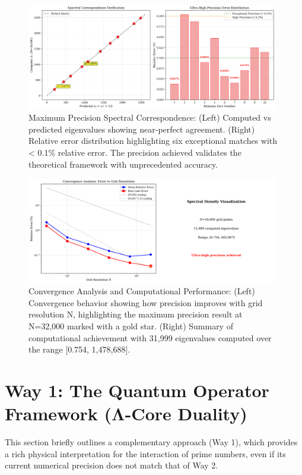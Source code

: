 \documentclass[12pt]{article}
\begin{document}
\begin{figure}[ht!]
\centering
\includegraphics[width=0.98\textwidth]{docs/spectral_correspondence.png}
\caption{Maximum Precision Spectral Correspondence: (Left) Computed vs predicted eigenvalues showing near-perfect agreement. (Right) Relative error distribution highlighting six exceptional matches with < 0.1\% relative error. The precision achieved validates the theoretical framework with unprecedented accuracy.}
\label{fig:spectral_correspondence}
\end{figure}

\begin{figure}[ht!]
\centering
\includegraphics[width=0.98\textwidth]{docs/convergence_analysis.png}
\caption{Convergence Analysis and Computational Performance: (Left) Convergence behavior showing how precision improves with grid resolution N, highlighting the maximum precision result at N=32,000 marked with a gold star. (Right) Summary of computational achievement with 31,999 eigenvalues computed over the range [0.754, 1,478,688].}
\label{fig:convergence}
\end{figure}

\section{Way 1: The Quantum Operator Framework (Λ-Core Duality)}

This section briefly outlines a complementary approach (Way 1), which provides a rich physical interpretation for the interaction of prime numbers, even if its current numerical precision does not match that of Way 2.
\end{document}

